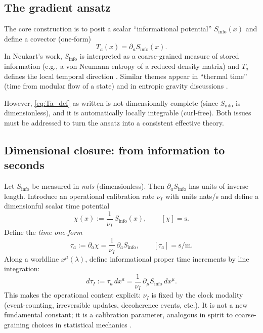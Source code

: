\documentclass[11pt]{article}
\newcommand{\Sinfo}{S_{\mathrm{info}}}
\newcommand{\Ta}{T_a}
\newcommand{\tua}{\tau_a}
\begin{document}
        \subsection{The gradient ansatz}
            The core construction is to posit a scalar ``informational potential'' $\Sinfo(x)$ and define a covector (one-form)
            \begin{equation}
                \Ta(x) = \partial_a \Sinfo(x).
                \label{eq:Ta_def}
            \end{equation}
            In Neukart's work, $\Sinfo$ is interpreted as a coarse-grained measure of stored information (e.g., a von Neumann entropy of a reduced density matrix) and $\Ta$ defines the local temporal direction \cite{Neukart2026_InfoTime}. Similar themes appear in ``thermal time'' (time from modular flow of a state) \cite{ConnesRovelli1994_ThermalTime} and in entropic gravity discussions \cite{Jacobson1995_ThermoSpacetime,Verlinde2011_Entropic}.

            However, \eqref{eq:Ta_def} as written is not dimensionally complete (since $\Sinfo$ is dimensionless), and it is automatically locally integrable (curl-free). Both issues must be addressed to turn the ansatz into a consistent effective theory.

        \subsection{Dimensional closure: from information to seconds}
            Let $\Sinfo$ be measured in \emph{nats} (dimensionless). Then $\partial_a\Sinfo$ has units of inverse length.
            Introduce an operational calibration rate $\nu_I$ with units nats/s and define a dimensionful scalar time potential
            \begin{equation}
                \chi(x) := \frac{1}{\nu_I}\, \Sinfo(x),
                \qquad [\chi]=\mathrm{s}.
                \label{eq:chi_def}
            \end{equation}
            Define the \emph{time one-form}
            \begin{equation}
                \tua := \partial_a \chi = \frac{1}{\nu_I}\,\partial_a \Sinfo,
                \qquad [\tua]=\mathrm{s/m}.
                \label{eq:tua_def}
            \end{equation}
            Along a worldline $x^\mu(\lambda)$, define informational proper time increments by line integration:
            \begin{equation}
                d\tau_I := \tua \, dx^a = \frac{1}{\nu_I}\,\partial_\mu \Sinfo\,dx^\mu.
                \label{eq:tauI_line}
            \end{equation}
            This makes the operational content explicit: $\nu_I$ is fixed by the clock modality (event-counting, irreversible updates, decoherence events, etc.). It is not a new fundamental constant; it is a calibration parameter, analogous in spirit to coarse-graining choices in statistical mechanics \cite{CoverThomas2006_InfoTheory,Lebowitz1993_Boltzmann}.
\end{document}
